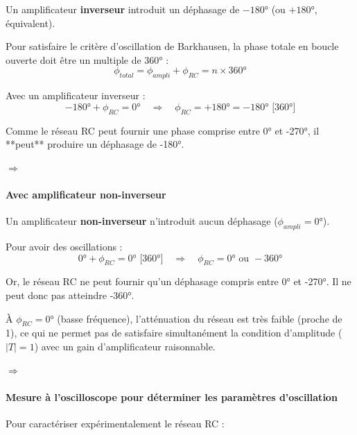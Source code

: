 \documentclass[11pt,a4paper]{article}
\begin{document}
Un amplificateur \textbf{inverseur} introduit un déphasage de $-180°$ (ou $+180°$, équivalent).

Pour satisfaire le critère d'oscillation de Barkhausen, la phase totale en boucle ouverte doit être un multiple de $360°$ :
\begin{equation}
\phi_{total} = \phi_{ampli} + \phi_{RC} = n \times 360°
\end{equation}

Avec un amplificateur inverseur :
\begin{equation}
-180° + \phi_{RC} = 0° \quad \Rightarrow \quad \phi_{RC} = +180° = -180° \text{ [360°]}
\end{equation}

Comme le réseau RC peut fournir une phase comprise entre 0° et -270°, il **peut** produire un déphasage de -180°.

$\Rightarrow$ 

\paragraph{Avec amplificateur non-inverseur}

Un amplificateur \textbf{non-inverseur} n'introduit aucun déphasage ($\phi_{ampli} = 0°$).

Pour avoir des oscillations :
\begin{equation}
0° + \phi_{RC} = 0° \text{ [360°]} \quad \Rightarrow \quad \phi_{RC} = 0° \text{ ou } -360°
\end{equation}

Or, le réseau RC ne peut fournir qu'un déphasage compris entre 0° et -270°. Il ne peut donc pas atteindre -360°.

À $\phi_{RC} = 0°$ (basse fréquence), l'atténuation du réseau est très faible (proche de 1), ce qui ne permet pas de satisfaire simultanément la condition d'amplitude ($|T| = 1$) avec un gain d'amplificateur raisonnable.

$\Rightarrow$ 

\paragraph{Mesure à l'oscilloscope pour déterminer les paramètres d'oscillation}

Pour caractériser expérimentalement le réseau RC :
\end{document}
